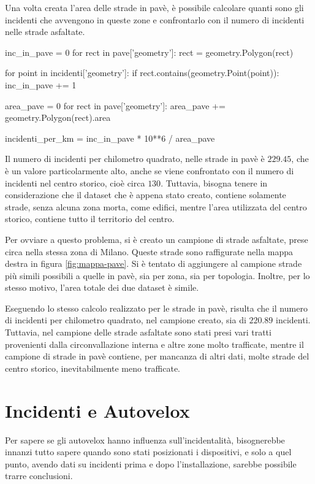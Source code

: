 \documentclass[a4paper,12pt]{report}
\begin{document}
Una volta creata l'area delle strade in pavè, è possibile calcolare quanti sono gli 
incidenti che avvengono in queste zone e confrontarlo con il numero di incidenti 
nelle strade asfaltate.

\begin{code}
inc_in_pave = 0
for rect in pave['geometry']: 
    rect = geometry.Polygon(rect)

    for point in incidenti['geometry']: 
        if rect.contains(geometry.Point(point)): 
            inc_in_pave += 1

area_pave = 0
for rect in pave['geometry']: 
    area_pave += geometry.Polygon(rect).area

incidenti_per_km = inc_in_pave * 10**6 / area_pave
\end{code}

Il numero di incidenti per chilometro quadrato, nelle strade in pavè è $229.45$, che 
è un valore particolarmente alto, anche se viene confrontato con il numero di 
incidenti nel centro storico, cioè circa $130$.
Tuttavia, bisogna tenere in considerazione che il dataset che è appena stato creato, 
contiene solamente strade, senza alcuna zona morta, come edifici, mentre l'area utilizzata 
del centro storico, contiene tutto il territorio del centro.

Per ovviare a questo problema, si è creato un campione di strade asfaltate, prese circa 
nella stessa zona di Milano. 
Queste strade sono raffigurate nella mappa destra in figura \ref{fig:mappa-pave}. 
Si è tentato di aggiungere al campione strade più simili possibili a 
quelle in pavè, sia per zona, sia per topologia. 
Inoltre, per lo stesso motivo, l'area totale dei due dataset è simile.

Eseguendo lo stesso calcolo realizzato per le strade in pavè, risulta che il numero di incidenti per 
chilometro quadrato, nel campione creato, sia di $220.89$ incidenti.
Tuttavia, nel campione delle strade asfaltate sono stati presi vari tratti provenienti dalla 
circonvallazione interna e altre zone molto trafficate, mentre il campione di strade in pavè 
contiene, per mancanza di altri dati, molte strade del centro storico, inevitabilmente 
meno trafficate.

\section{Incidenti e Autovelox}

Per sapere se gli autovelox hanno influenza sull'incidentalità, 
bisognerebbe innanzi tutto sapere quando sono stati posizionati i dispositivi, e solo 
a quel punto, avendo dati su incidenti prima e dopo l'installazione, sarebbe 
possibile trarre conclusioni.
\end{document}
